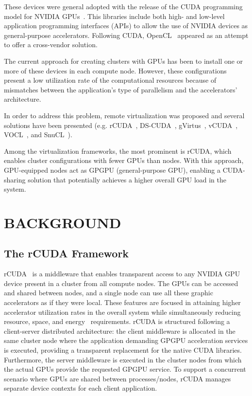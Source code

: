 \documentclass[a4paper,twoside]{article}
\begin{document}
These devices were general adopted with the release of the CUDA programming model for
NVIDIA GPUs~\cite{cuda65}. This libraries include both high- and low-level application programming interfaces (APIs)
to allow the use of NVIDIA devices as general-purpose
accelerators.
Following CUDA, OpenCL~\cite{opencl} appeared as an attempt
to offer a cross-vendor solution.

The current approach for creating clusters with GPUs has been to
install one or more of these devices in each compute node.
However, these configurations present a low
utilization rate of the computational resources
 because of mismatches between the application's type of parallelism
and the accelerators' architecture.

In order to address this problem, remote virtualization was proposed
and several solutions have been presented (e.g. {rCUDA}~\cite{tonithesis,toniparco},
DS-CUDA~\cite{dscuda}, gVirtus~\cite{gvirtus}, vCUDA~\cite{vcuda}, VOCL~\cite{vocl}, and SnuCL~\cite{snucl}).

Among the virtualization frameworks, the most
prominent is {rCUDA}, which
enables cluster configurations with fewer GPUs than nodes.  With this
approach, GPU-equipped nodes act as GPGPU (general-purpose GPU), enabling a CUDA-sharing solution that potentially achieves
a higher overall GPU load in the system.

\section{\uppercase{Background}}
\label{sec:background}
\subsection{The rCUDA Framework}
\label{sec:rcuda}
{rCUDA}~\cite{tonithesis,toniparco} is a middleware that enables transparent access
to any NVIDIA GPU device present in a cluster from all compute
nodes. The GPUs can be accessed and shared between nodes, and a single node can use all these graphic accelerators
as if they were local.
These features are focused in attaining higher accelerator utilization rates in the overall system while simultaneously reducing
resource, space, and energy~\cite{energy14} requirements.
rCUDA is structured following a client-server distributed
architecture: the client middleware is allocated in the same cluster node where the application demanding GPGPU
acceleration services is executed, providing a transparent replacement for the
native CUDA libraries. Furthermore, the server middleware is executed in the
cluster nodes from which the actual GPUs provide the requested GPGPU service.
To support a concurrent scenario where GPUs are shared between
processes\slash nodes, {rCUDA} manages separate device contexts for
each client application.
\end{document}

